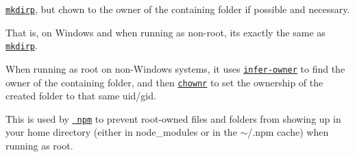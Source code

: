 \href{http://npm.im/mkdirp}{\texttt{ {\ttfamily mkdirp}}}, but chown to the owner of the containing folder if possible and necessary.

That is, on Windows and when running as non-\/root, it\textquotesingle{}s exactly the same as \href{http://npm.im/mkdirp}{\texttt{ {\ttfamily mkdirp}}}.

When running as root on non-\/\+Windows systems, it uses \href{http://npm.im/infer-owner}{\texttt{ {\ttfamily infer-\/owner}}} to find the owner of the containing folder, and then \href{http://npm.im/chownr}{\texttt{ {\ttfamily chownr}}} to set the ownership of the created folder to that same uid/gid.

This is used by \href{http://npm.im/npm}{\texttt{ npm}} to prevent root-\/owned files and folders from showing up in your home directory (either in {\ttfamily node\+\_\+modules} or in the {\ttfamily $\sim$/.npm} cache) when running as root. 
